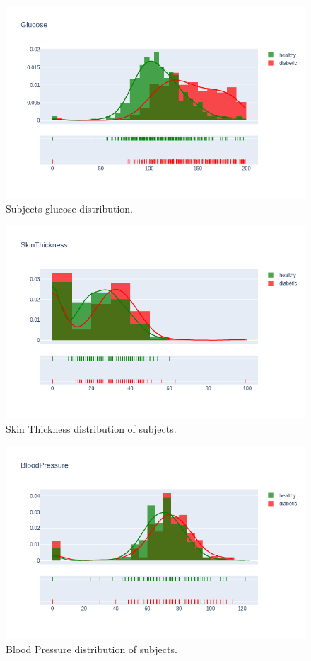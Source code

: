 \documentclass[12pt]{article}
\begin{document}
\begin{figure}[ht]
\centering
\includegraphics[width=1\textwidth]{7.png}
\caption{\label{fig:15} Subjects glucose distribution.}
\end{figure}

\begin{figure}[ht]
\centering
\includegraphics[width=1\textwidth]{8.png}
\caption{\label{fig:16} Skin Thickness distribution of subjects.}
\end{figure}

\begin{figure}[ht]
\centering
\includegraphics[width=1\textwidth]{9.png}
\caption{\label{fig:17} Blood Pressure distribution of subjects.}
\end{figure}
\end{document}
